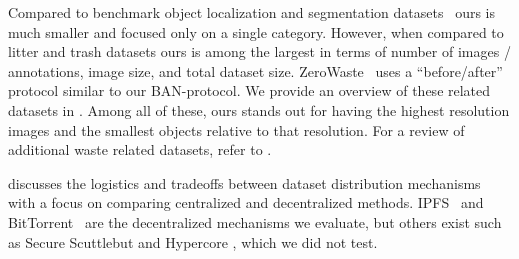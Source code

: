 \documentclass[10pt,twocolumn,letterpaper]{article}
\begin{document}
Compared to benchmark object localization and segmentation datasets~\cite{ILSVRC15,
  lin_microsoft_2014,cordts2015cityscapes} ours is much smaller and focused only on a single category.
However, when compared to litter and trash datasets
  \cite{bashkirova_zerowaste_2022,proenca_taco_2020,hong2020trashcansemanticallysegmenteddatasetvisual,mittal2016spotgarbage,rs13050965}
  ours is among the largest in terms of number of images / annotations, image size, and total dataset size.
ZeroWaste~\cite{bashkirova_zerowaste_2022} uses a ``before/after'' protocol similar to our BAN-protocol.
We provide an overview of these related datasets in .
Among all of these, ours stands out for having the highest resolution images and the smallest objects
  relative to that resolution.
For a review of additional waste related datasets, refer to \cite{agnieszka_waste}.





 discusses the logistics and tradeoffs between dataset distribution mechanisms
  with a focus on comparing centralized and decentralized methods.
IPFS~\cite{cohen_incentives_2003} and BitTorrent~\cite{benet_ipfs_2014} are the decentralized 
  mechanisms we evaluate, but others exist such as Secure Scuttlebut \cite{tarr_secure_2019} and Hypercore
  \cite{frazee_dep-0002_nodate}, which we did not test.
\end{document}

